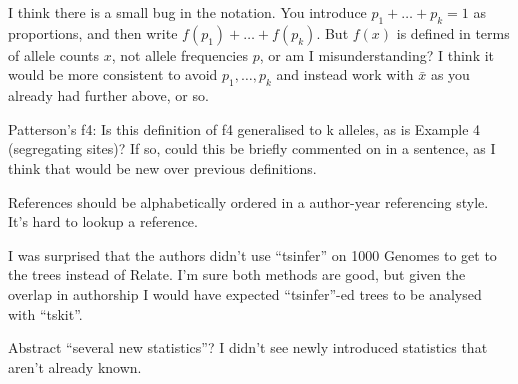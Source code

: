 \reply{
}

\begin{point}{\revref}
    I think there is a small bug in the notation. You introduce $p_1+\ldots+p_k=1$ as proportions, and then write $f(p_1)+\ldots+f(p_k)$. But $f(x)$ is defined in terms of allele counts $x$, not allele frequencies $p$, or am I misunderstanding? I think it would be more consistent to avoid $p_1,\ldots,p_k$ and instead work with $\bar{x}$ as you already had further above, or so.
\end{point}


\begin{point}{\revref}
    Patterson's f4: Is this definition of f4 generalised to k alleles, as is Example 4 (segregating sites)? If so, could this be briefly commented on in a sentence, as I think that would be new over previous definitions.
\end{point}


\begin{point}{References}
    should be alphabetically ordered in a author-year referencing style. It's hard to lookup a reference.
\end{point}


\begin{point}{\revref}
I was surprised that the authors didn't use ``tsinfer'' on 1000 Genomes to get to the trees instead of Relate. I'm sure both methods are good, but given the overlap in authorship I would have expected ``tsinfer''-ed trees to be analysed with ``tskit''.
\end{point}


\begin{point}{Abstract \revref}
    ``several new statistics''? I didn't see newly introduced statistics that aren't already known.
\end{point}

